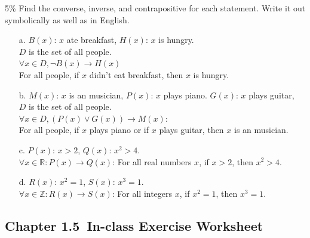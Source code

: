 \documentclass[a4paper,12pt]{book}
\newcommand{\laChapter}{1.5\ }
\newcounter{question}
\begin{document}
        \begin{question}{\thequestion}{5\%}
            Find the converse, inverse, and contrapositive for each statement.
            Write it out symbolically as well as in English.
            
            \begin{enumerate}
                \item[a.] $B(x)$: $x$ ate breakfast, $H(x)$: $x$ is hungry. \\
                    $D$ is the set of all people. \\
                    $\forall x \in D, \neg B(x) \to H(x)$ \\
                    For all people, if $x$ didn't eat breakfast, then $x$ is hungry.
                \item[b.] $M(x)$: $x$ is an musician, $P(x)$: $x$ plays piano. $G(x)$: $x$ plays guitar, \\
                    $D$ is the set of all people. \\
                    $\forall x \in D, (P(x) \lor G(x)) \to M(x)$: \\
                    For all people, if $x$ plays piano or if $x$ plays guitar, then $x$ is an musician.
                \item[c.] $P(x)$: $x > 2$, $Q(x)$: $x^{2}  > 4$. \\
                    $\forall x \in \mathbb{R}: P(x) \to Q(x)$:
                    For all real numbers $x$, if $x > 2$, then $x^{2} > 4$.
                \item[d.] $R(x)$: $x^{2} = 1$, $S(x)$: $x^{3} = 1$. \\
                    $\forall x \in \mathbb{Z}: R(x) \to S(x)$:
                    For all integers $x$, if $x^{2} = 1$, then $x^{3} = 1$.
            \end{enumerate}
        \end{question}

            

        
    \newpage
    \begin{center} \section*{Chapter \laChapter In-class Exercise Worksheet} \end{center}
\end{document}
